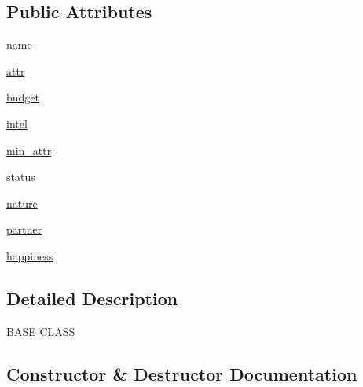 \subsection*{Public Attributes}
\begin{DoxyCompactItemize}
\item 
\hyperlink{classboys_1_1boy_1_1_boy_a514c8925a76eb6af83bb59b5c6463b8d}{name}
\item 
\hyperlink{classboys_1_1boy_1_1_boy_a48d62174385cc6ca7b1fa64051e817b5}{attr}
\item 
\hyperlink{classboys_1_1boy_1_1_boy_ad2a3cceabf13f65bd93b878075d73c55}{budget}
\item 
\hyperlink{classboys_1_1boy_1_1_boy_a1d9b84b6e47b4f09589bc8b90bed47c8}{intel}
\item 
\hyperlink{classboys_1_1boy_1_1_boy_abc427640fd12a0fa2ec7f4ae99330f46}{min\+\_\+attr}
\item 
\hyperlink{classboys_1_1boy_1_1_boy_a3932b84d71dfe36bb93c551dc5c40bed}{status}
\item 
\hyperlink{classboys_1_1boy_1_1_boy_ab142b2f597ee95ecbb5d1d2c375958f6}{nature}
\item 
\hyperlink{classboys_1_1boy_1_1_boy_a49e8d59f5c18d4e07a393784847da83e}{partner}
\item 
\hyperlink{classboys_1_1boy_1_1_boy_adcd0f0fe7dff996d7b9702b5733c335e}{happiness}
\end{DoxyCompactItemize}


\subsection{Detailed Description}
\begin{DoxyVerb}BASE CLASS\end{DoxyVerb}
 

\subsection{Constructor \& Destructor Documentation}
